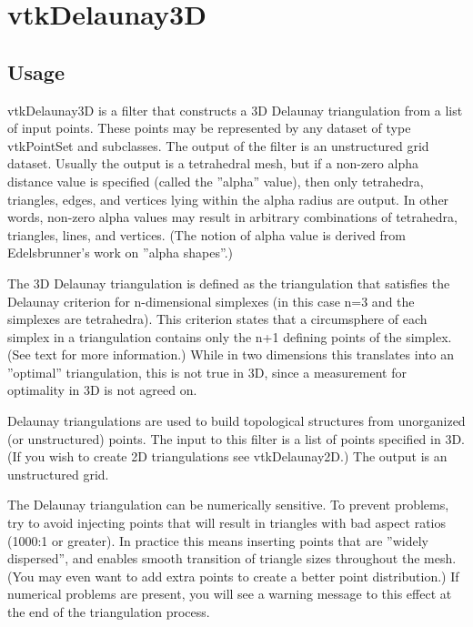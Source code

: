\section{vtkDelaunay3D}

\subsection{Usage}

 vtkDelaunay3D is a filter that constructs a 3D Delaunay
 triangulation from a list of input points. These points may be
 represented by any dataset of type vtkPointSet and subclasses. The
 output of the filter is an unstructured grid dataset. Usually the
 output is a tetrahedral mesh, but if a non-zero alpha distance
 value is specified (called the ''alpha'' value), then only tetrahedra,
 triangles, edges, and vertices lying within the alpha radius are 
 output. In other words, non-zero alpha values may result in arbitrary
 combinations of tetrahedra, triangles, lines, and vertices. (The notion 
 of alpha value is derived from Edelsbrunner's work on ''alpha shapes''.)
 
 The 3D Delaunay triangulation is defined as the triangulation that
 satisfies the Delaunay criterion for n-dimensional simplexes (in
 this case n=3 and the simplexes are tetrahedra). This criterion
 states that a circumsphere of each simplex in a triangulation
 contains only the n+1 defining points of the simplex. (See text for
 more information.) While in two dimensions this translates into an
 ''optimal'' triangulation, this is not true in 3D, since a measurement 
 for optimality in 3D is not agreed on.

 Delaunay triangulations are used to build topological structures
 from unorganized (or unstructured) points. The input to this filter
 is a list of points specified in 3D. (If you wish to create 2D 
 triangulations see vtkDelaunay2D.) The output is an unstructured grid.
 
 The Delaunay triangulation can be numerically sensitive. To prevent
 problems, try to avoid injecting points that will result in
 triangles with bad aspect ratios (1000:1 or greater). In practice
 this means inserting points that are ''widely dispersed'', and
 enables smooth transition of triangle sizes throughout the
 mesh. (You may even want to add extra points to create a better
 point distribution.) If numerical problems are present, you will
 see a warning message to this effect at the end of the
 triangulation process.

